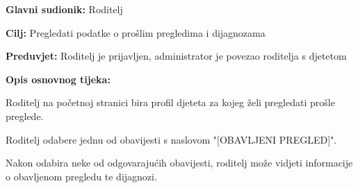 					\noindent {}
					\begin{packed_item}
						
						\item \textbf{Glavni sudionik: }Roditelj
						\item  \textbf{Cilj:} Pregledati podatke o prošlim pregledima i dijagnozama
						\item  \textbf{Preduvjet:} Roditelj je prijavljen, administrator je povezao roditelja s djetetom
						\item  \textbf{Opis osnovnog tijeka:}
						
						\item[] \begin{packed_enum}
							
							\item Roditelj na početnoj stranici bira profil djeteta za kojeg želi pregledati prošle preglede.
							\item Roditelj odabere jednu od obavijesti s naslovom "[OBAVLJENI PREGLED]".
							\item Nakon odabira neke od odgovarajućih obavijesti, roditelj može vidjeti informacije o obavljenom pregledu te dijagnozi.
						\end{packed_enum}
						
						
					\end{packed_item}
					
